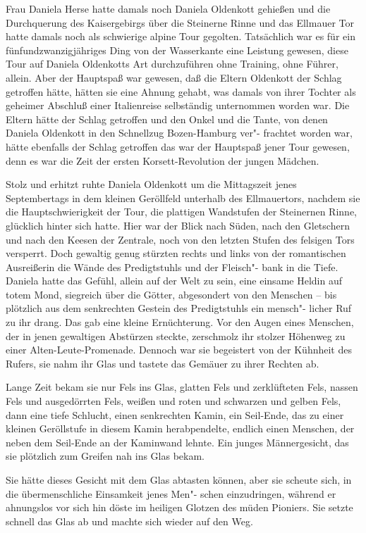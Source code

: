 Frau Daniela Herse hatte damals noch Daniela Oldenkott
gehießen und die Durchquerung des Kaisergebirgs über die
Steinerne Rinne und das Ellmauer Tor hatte damals noch
als schwierige alpine Tour gegolten. Tatsächlich war es für
ein fünfundzwanzigjähriges Ding von der Wasserkante eine
Leistung gewesen, diese Tour auf Daniela Oldenkotts Art
durchzuführen\dopp{} ohne Training, ohne Führer, allein. Aber der
Hauptspaß war gewesen, daß die Eltern Oldenkott der Schlag
getroffen hätte, hätten sie eine Ahnung gehabt, was damals
von ihrer Tochter als geheimer Abschluß einer Italienreise
selbständig unternommen worden war. Die Eltern hätte der
Schlag getroffen und den Onkel und die Tante, von denen
Daniela Oldenkott in den Schnellzug Bozen-Hamburg ver"-%
frachtet worden war, hätte ebenfalls der Schlag getroffen\dopp{}
das war der Hauptspaß jener Tour gewesen, denn es war die
Zeit der ersten Korsett-Revolution der jungen Mädchen.

Stolz und erhitzt ruhte Daniela Oldenkott um die Mittagszeit
jenes Septembertags in dem kleinen Geröllfeld unterhalb
des Ellmauertors, nachdem sie die Hauptschwierigkeit der
Tour, die plattigen Wandstufen der Steinernen Rinne,
glücklich hinter sich hatte. Hier war der Blick nach Süden,
nach den Gletschern und nach den Keesen der Zentrale,
noch von den letzten Stufen des felsigen Tors versperrt. Doch
gewaltig genug stürzten rechts und links von der romantischen
Ausreißerin die Wände des Predigtstuhls und der Fleisch"-%
bank in die Tiefe. Daniela hatte das Gefühl, allein auf der
Welt zu sein, eine einsame Heldin auf totem Mond, siegreich
über die Götter, abgesondert von den Menschen -- bis plötzlich
aus dem senkrechten Gestein des Predigtstuhls ein mensch"-%
licher Ruf zu ihr drang. Das gab eine kleine Ernüchterung.
Vor den Augen eines Menschen, der in jenen gewaltigen
Abstürzen steckte, zerschmolz ihr stolzer Höhenweg zu einer
Alten-Leute-Promenade. Dennoch war sie begeistert von der
Kühnheit des Rufers, sie nahm ihr Glas und tastete das
Gemäuer zu ihrer Rechten ab.

Lange Zeit bekam sie nur Fels ins Glas, glatten Fels und
zerklüfteten Fels, nassen Fels und ausgedörrten Fels, weißen
und roten und schwarzen und gelben Fels, dann eine tiefe
Schlucht, einen senkrechten Kamin, ein Seil-Ende, das zu
einer kleinen Geröllstufe in diesem Kamin herabpendelte,
endlich einen Menschen, der neben dem Seil-Ende an der
Kaminwand lehnte. Ein junges Männergesicht, das sie plötzlich
zum Greifen nah ins Glas bekam.

Sie hätte dieses Gesicht mit dem Glas abtasten können, aber
sie scheute sich, in die übermenschliche Einsamkeit jenes Men"-%
schen einzudringen, während er ahnungslos vor sich hin döste
im heiligen Glotzen des müden Pioniers. Sie setzte schnell das
Glas ab und machte sich wieder auf den Weg.

